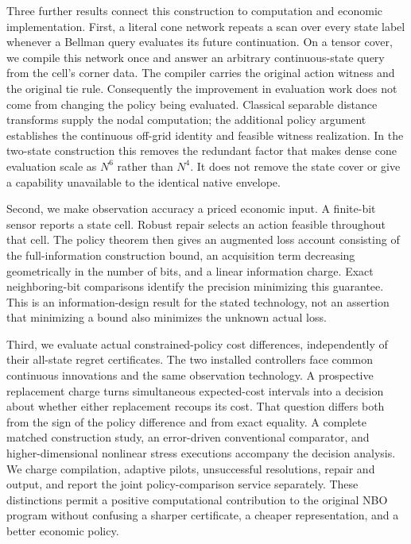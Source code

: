 \documentclass[ecta,nameyear,draft]{econsocart}
\begin{document}
Three further results connect this construction to computation and economic implementation. First, a literal cone network repeats a scan over every state label whenever a Bellman query evaluates its future continuation. On a tensor cover, we compile this network once and answer an arbitrary continuous-state query from the cell's corner data. The compiler carries the original action witness and the original tie rule. Consequently the improvement in evaluation work does not come from changing the policy being evaluated. Classical separable distance transforms supply the nodal computation; the additional policy argument establishes the continuous off-grid identity and feasible witness realization. In the two-state construction this removes the redundant factor that makes dense cone evaluation scale as $N^6$ rather than $N^4$. It does not remove the state cover or give a capability unavailable to the identical native envelope.

Second, we make observation accuracy a priced economic input. A finite-bit sensor reports a state cell. Robust repair selects an action feasible throughout that cell. The policy theorem then gives an augmented loss account consisting of the full-information construction bound, an acquisition term decreasing geometrically in the number of bits, and a linear information charge. Exact neighboring-bit comparisons identify the precision minimizing this guarantee. This is an information-design result for the stated technology, not an assertion that minimizing a bound also minimizes the unknown actual loss.

Third, we evaluate actual constrained-policy cost differences, independently of their all-state regret certificates. The two installed controllers face common continuous innovations and the same observation technology. A prospective replacement charge turns simultaneous expected-cost intervals into a decision about whether either replacement recoups its cost. That question differs both from the sign of the policy difference and from exact equality. A complete matched construction study, an error-driven conventional comparator, and higher-dimensional nonlinear stress executions accompany the decision analysis. We charge compilation, adaptive pilots, unsuccessful resolutions, repair and output, and report the joint policy-comparison service separately. These distinctions permit a positive computational contribution to the original NBO program without confusing a sharper certificate, a cheaper representation, and a better economic policy.
\end{document}
